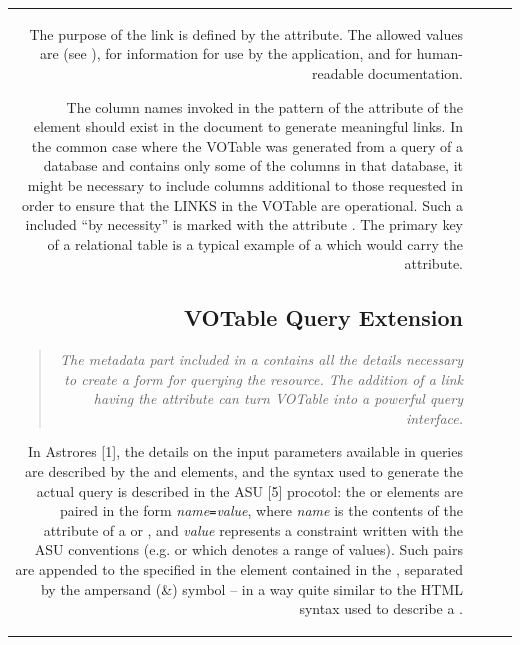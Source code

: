 \begin{tabular}{RRCp{0.8\textwidth}}
\begin{center}
{The purpose of the link is defined by the {}
attribute. The allowed values are {} 
(see ), 
{} for information for use by the application,
and {} for  human-readable documentation.

The column names invoked in the pattern of the  attribute
of the  element should exist in the document to 
generate meaningful links. 
In the common case where the VOTable was generated from a query
of a database and contains only some of the columns in that
database, it might be necessary to include columns additional to
those requested in order to ensure that the LINKS in the VOTable
are operational.
Such a  included ``by necessity'' is marked with 
the attribute . The primary key of
a relational table is a typical example of a  
which would carry the  attribute.

\subsection{VOTable Query Extension}
\label{query}

\begin{quote}\em{}
  The metadata part included in  a  contains
  all the details necessary to create a {\em form} for querying
  the resource. The addition of a link having the  
  attribute can turn VOTable into a powerful query interface.
\end{quote}

\noindent In Astrores [1], the details on the input parameters available in
queries are described by the 
{} and {} elements, and the syntax used
to generate the actual query is described in the ASU [5] procotol:
the {} or  elements are
paired in the form {\it name}{{\tt=}}{\it value},
where {\it name} is the contents of the
 attribute of a  or , 
and  {\it value} represents a constraint
written with the ASU conventions (e.g. 
 or {}
which denotes a range of values). 
Such pairs are  appended to the
{} specified in the {}
element contained in the {{}},
separated by the ampersand (\&) symbol --
in a way quite similar to the HTML syntax used to 
describe a {}.

}
\end{center}
\end{tabular}
